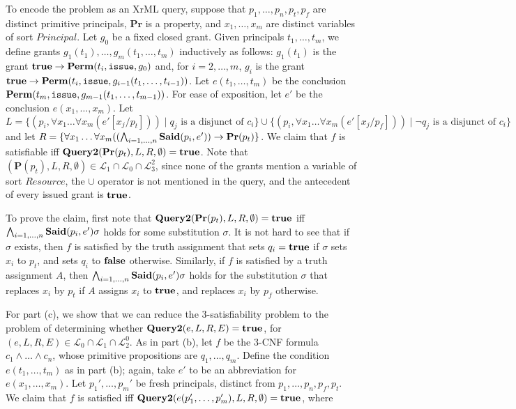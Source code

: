 \documentclass{acmtrans2m}
\newcommand{\<}{
}
\renewcommand{\>}{\rangle}
\newcommand{\union}{\cup}
\newcommand{\inter}{\cap}
\newcommand{\cL}{\mathcal{L}}
\newcommand{\Said}{\mathit{\bf Said}}
\newcommand{\true}{\mathit{\bf{true}}}
\newcommand{\false}{\mathit{\bf{false}}}
\newcommand{\Permitted}{\mathit{\bf Perm}}
\newcommand{\cc}{e}
\newcommand{\scc}{E}
\newcommand{\issue}{\mathtt{issue}}
\newcommand{\imp}{\rightarrow}
\newcommand{\XProcTwo}{\textbf{Query2}}
\newcommand{\Princ}{\mathit{Principal}}
\newcommand{\Rsrc}{\mathit{Resource}}
\newcommand{\pred}[1]{\mathbf{#1}}
\begin{document}
\begin{sloppypar}
To encode the problem as an XrML query, suppose that $p_1, \ldots, p_n, p_t, p_f$ are distinct primitive principals, $\pred{Pr}$ is a property, and $x_1, \ldots, x_m$ are distinct variables of sort $\Princ$.  Let $g_0$ be a fixed closed grant.  Given principals $t_1, \ldots, t_m$, we define grants $g_1(t_1), \ldots, g_m(t_1, \ldots, t_m)$ inductively
as follows: $g_1(t_1)$ is the grant $\true \imp \Permitted(t_i, \issue, g_0)$ and, for $i = 2, \ldots, m$, $g_i$ is
the grant $\true \imp \Permitted(t_i, \issue, g_{i-1}(t_1, \ldots, t_{i-1}))$.  Let $\cc(t_1, \ldots, t_m)$ be the conclusion $\Permitted(t_m, \issue, g_{m-1}(t_1, \ldots, t_{m-1}))$.  For ease of exposition, let $\cc'$ be the conclusion $\cc(x_1, \ldots, x_m)$.  Let
$
L = \{(p_i, \forall x_1\ldots\forall x_m(e'[x_j/p_t])) \mid \mbox{$q_j$ is a disjunct of $c_i$}\} \union
\{(p_i, \forall x_1\ldots\forall x_m(e'[x_j/p_f])) \mid \mbox{$\neg q_j$ is a disjunct of $c_i$}\}
$
and let $R = \{\forall x_1 \ldots \forall x_m ((\bigwedge_{i = 1, \ldots, n}\Said(p_i, \cc'))\imp
\pred{Pr}(p_t)\}$.  We claim that $f$ is satisfiable iff
$\XProcTwo(\pred{Pr}(p_t), L, R, \emptyset) = \true$.  Note that
$(\pred{P}(p_t),L,R, \emptyset)\in \cL_1 \inter \cL_0\inter\cL_3^2$, since none of the grants mention
a variable of sort $\Rsrc$, the $\union$ operator is not mentioned in the query, and the antecedent of
every issued grant is $\true$.

To prove the claim, first note that $\XProcTwo(\pred{Pr}(p_t), L, R, \emptyset) = \true$ iff
$\bigwedge_{i = 1, \ldots, n}\Said(p_i, \cc')\sigma$ holds for some substitution $\sigma$.  It is not hard to see that if $\sigma$ exists, then $f$ is satisfied by the truth assignment that sets $q_i = \true$ if $\sigma$ sets $x_i$ to $p_t$, and sets $q_i$ to $\false$ otherwise.  Similarly, if $f$ is satisfied by a truth assignment $A$, then $\bigwedge_{i = 1, \ldots, n}\Said(p_i, \cc')\sigma$ holds for the substitution $\sigma$ that replaces $x_i$ by $p_t$ if $A$ assigns $x_i$ to $\true$, and replaces $x_i$ by $p_f$ otherwise.
\end{sloppypar}

For part (c), we show that we can reduce the 3-satisfiability problem to
the problem of determining whether $\XProcTwo(\cc, L, R, \scc) = \true$,
for $(\cc, L, R, \scc)\in \cL_0\inter\cL_1\cap\cL_2^{0}$.  As in part (b), let $f$
be the 3-CNF formula $c_1 \land \ldots \land c_n$, whose primitive
propositions are $q_1, \ldots, q_m$.  Define the condition $e(t_1,
\ldots, t_m)$ as in part (b); again, take $e'$ to be an abbreviation
for $e(x_1, \ldots, x_m)$.  Let $p_1', \ldots, p_m'$ be fresh
principals, distinct from $p_1, \ldots, p_n, p_f, p_t$.  We claim that
$f$ is satisfied iff $\XProcTwo(\cc(p'_1, \ldots, p'_m), L,  R,
\emptyset) = \true$, where
\end{document}
